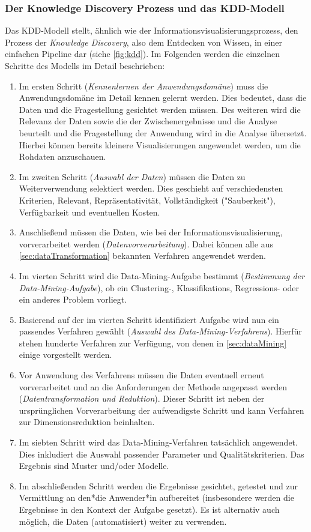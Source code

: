 			\subsubsection{Der Knowledge Discovery Prozess und das KDD-Modell}
				Das KDD-Modell stellt, ähnlich wie der Informationsvisualisierungsprozess, den Prozess der \emph{Knowledge Discovery}, also dem Entdecken von Wissen, in einer einfachen Pipeline dar (siehe \autoref{fig:kdd}). Im Folgenden werden die einzelnen Schritte des Modells im Detail beschrieben:
				\begin{enumerate}
					\item Im ersten Schritt (\emph{Kennenlernen der Anwendungsdomäne}) muss die Anwendungsdomäne im Detail kennen gelernt werden. Dies bedeutet, dass die Daten und die Fragestellung gesichtet werden müssen. Des weiteren wird die Relevanz der Daten sowie die der Zwischenergebnisse und die Analyse beurteilt und die Fragestellung der Anwendung wird in die Analyse übersetzt. Hierbei können bereits kleinere Visualisierungen angewendet werden, \zB um die Rohdaten anzuschauen.
					\item Im zweiten Schritt (\emph{Auswahl der Daten}) müssen die Daten zu Weiterverwendung selektiert werden. Dies geschieht auf verschiedensten Kriterien, \zB Relevant, Repräsentativität, Vollständigkeit ("Sauberkeit"), Verfügbarkeit und eventuellen Kosten.
					\item Anschließend müssen die Daten, wie bei der Informationsvisualisierung, vorverarbeitet werden (\emph{Datenvorverarbeitung}). Dabei können alle aus \autoref{sec:dataTransformation} bekannten Verfahren angewendet werden.
					\item Im vierten Schritt wird die Data-Mining-Aufgabe bestimmt (\emph{Bestimmung der Data-Mining-Aufgabe}), \dh ob ein Clustering-, Klassifikations, Regressions- oder ein anderes Problem vorliegt.
					\item Basierend auf der im vierten Schritt identifiziert Aufgabe wird nun ein passendes Verfahren gewählt (\emph{Auswahl des Data-Mining-Verfahrens}). Hierfür stehen hunderte Verfahren zur Verfügung, von denen in \autoref{sec:dataMining} einige vorgestellt werden.
					\item Vor Anwendung des Verfahrens müssen die Daten eventuell erneut vorverarbeitet und an die Anforderungen der Methode angepasst werden (\emph{Datentransformation und Reduktion}). Dieser Schritt ist neben der ursprünglichen Vorverarbeitung der aufwendigste Schritt und kann \zB Verfahren zur Dimensionsreduktion beinhalten.
					\item Im siebten Schritt wird das Data-Mining-Verfahren tatsächlich angewendet. Dies inkludiert die Auswahl passender Parameter und Qualitätskriterien. Das Ergebnis sind Muster und/oder Modelle.
					\item Im abschließenden Schritt werden die Ergebnisse gesichtet, getestet und zur Vermittlung an den*die Anwender*in aufbereitet (insbesondere werden die Ergebnisse in den Kontext der Aufgabe gesetzt). Es ist alternativ auch möglich, die Daten (automatisiert) weiter zu verwenden.
				\end{enumerate}

